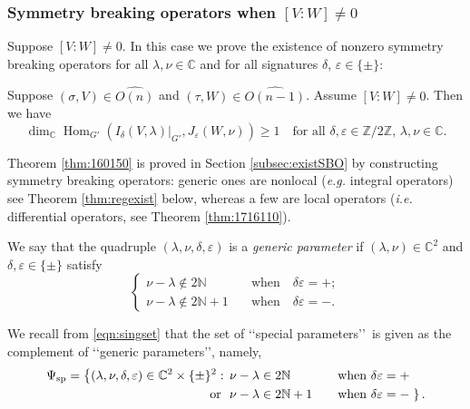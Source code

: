 \subsubsection{Symmetry breaking operators
 when $[V:W] \ne 0$}
\label{subsec:SBOVW1}
Suppose $[V:W] \ne 0$.  
In this case 
 we prove the existence of nonzero symmetry breaking operators
 for all $\lambda, \nu \in {\mathbb{C}}$
 and for all signatures $\delta$, $\varepsilon \in \{ \pm \}$:
\begin{theorem}
\label{thm:160150}
Suppose $(\sigma,V)\in \widehat{O(n)}$ and $(\tau,W)\in \widehat{O(n-1)}$.  
Assume $[V:W] \ne 0$.  
Then we have
\[
  \dim_{\mathbb{C}} \operatorname{Hom}_{G'}(I_{\delta}(V, \lambda)|_{G'}, J_{\varepsilon}(W, \nu))
  \ge 1
  \quad
  \text{for all }
  \delta, \varepsilon \in {\mathbb{Z}}/2 {\mathbb{Z}}, 
  \,
  \lambda, \nu \in {\mathbb{C}}.  
\]
\end{theorem}
%
Theorem \ref{thm:160150} is proved in Section \ref{subsec:existSBO}
 by constructing symmetry breaking operators:
 generic ones are nonlocal 
 ({\it{e.g.}} integral operators)
 see Theorem \ref{thm:regexist} below, 
 whereas a few are local operators
 ({\it{i.e.}} differential operators, 
 see Theorem \ref{thm:1716110}).  



\begin{definition}
\label{def:generic}
We say that the quadruple $(\lambda,\nu,\delta,\varepsilon)$
 is a 
 {\it{generic parameter}} if
$(\lambda, \nu)\in {\mathbb{C}}^2$ and $\delta, \varepsilon 
 \in \{\pm\}$ satisfy
\begin{equation}
\label{eqn:nlgen}
\begin{cases}
\nu-\lambda \not \in 2{\mathbb{N}}
\quad
&
\text{when}
\quad
\delta \varepsilon =+;
\\
\nu-\lambda \not \in 2{\mathbb{N}}+1
\quad
&
\text{when}
\quad
\delta \varepsilon =-.  
\end{cases}
\end{equation}
\end{definition}

We recall from \eqref{eqn:singset}
 that the set of \lq\lq{special parameters}\rq\rq\ is given 
 as the complement of \lq\lq{generic parameters}\rq\rq, 
 namely,
\begin{alignat}{2}
  \Psi_{{\operatorname{sp}}}
  =
  \left\{(\lambda,\nu, \delta, \varepsilon) \in {\mathbb{C}}^2 \times \{\pm\}^2
   :\,\,\right.
&   \nu-\lambda \in 2 {\mathbb{N}} 
&&\text{when $\delta \varepsilon =+$}
\notag
\\
   \text{ or }\,\,
&  \nu-\lambda \in 2 {\mathbb{N}}+1
\quad 
&&
\text{when $\delta \varepsilon =-$}
\left.\right\}.  
\label{eqn:Psisp}
\end{alignat}


